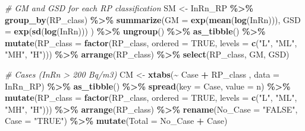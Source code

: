 \documentclass[
  12pt,
]{article}
\newenvironment{Shaded}{\begin{snugshade}}{\end{snugshade}}
\newcommand{\CommentTok}[1]{\textcolor[rgb]{0.56,0.35,0.01}{\textit{#1}}}
\newcommand{\DataTypeTok}[1]{\textcolor[rgb]{0.13,0.29,0.53}{#1}}
\newcommand{\KeywordTok}[1]{\textcolor[rgb]{0.13,0.29,0.53}{\textbf{#1}}}
\newcommand{\NormalTok}[1]{#1}
\newcommand{\OperatorTok}[1]{\textcolor[rgb]{0.81,0.36,0.00}{\textbf{#1}}}
\newcommand{\OtherTok}[1]{\textcolor[rgb]{0.56,0.35,0.01}{#1}}
\newcommand{\StringTok}[1]{\textcolor[rgb]{0.31,0.60,0.02}{#1}}
\begin{document}
\begin{Shaded}
\begin{Highlighting}[]
\CommentTok{\# GM and GSD for each RP classification}
\NormalTok{  SM \textless{}{-}}\StringTok{ }\NormalTok{InRn\_RP }\OperatorTok{\%\textgreater{}\%}
\StringTok{    }\KeywordTok{group\_by}\NormalTok{(RP\_class) }\OperatorTok{\%\textgreater{}\%}
\StringTok{    }\KeywordTok{summarize}\NormalTok{(}\DataTypeTok{GM  =} \KeywordTok{exp}\NormalTok{(}\KeywordTok{mean}\NormalTok{(}\KeywordTok{log}\NormalTok{(InRn))),}
              \DataTypeTok{GSD =} \KeywordTok{exp}\NormalTok{(}\KeywordTok{sd}\NormalTok{(}\KeywordTok{log}\NormalTok{(InRn))) }
\NormalTok{              ) }\OperatorTok{\%\textgreater{}\%}
\StringTok{    }\KeywordTok{ungroup}\NormalTok{() }\OperatorTok{\%\textgreater{}\%}
\StringTok{    }\KeywordTok{as\_tibble}\NormalTok{() }\OperatorTok{\%\textgreater{}\%}
\StringTok{    }\KeywordTok{mutate}\NormalTok{(}\DataTypeTok{RP\_class =} \KeywordTok{factor}\NormalTok{(RP\_class, }\DataTypeTok{ordered =} \OtherTok{TRUE}\NormalTok{, }
                             \DataTypeTok{levels =} \KeywordTok{c}\NormalTok{(}\StringTok{"L"}\NormalTok{, }\StringTok{"ML"}\NormalTok{, }\StringTok{"MH"}\NormalTok{, }\StringTok{"H"}\NormalTok{))) }\OperatorTok{\%\textgreater{}\%}
\StringTok{    }\KeywordTok{arrange}\NormalTok{(RP\_class) }\OperatorTok{\%\textgreater{}\%}
\StringTok{    }\KeywordTok{select}\NormalTok{(RP\_class, GM, GSD)}
  
\CommentTok{\# Cases (InRn \textgreater{} 200 Bq/m3)}
\NormalTok{  CM \textless{}{-}}\StringTok{ }\KeywordTok{xtabs}\NormalTok{(}\OperatorTok{\textasciitilde{}}\StringTok{ }\NormalTok{Case }\OperatorTok{+}\StringTok{ }\NormalTok{RP\_class , }\DataTypeTok{data =}\NormalTok{ InRn\_RP) }\OperatorTok{\%\textgreater{}\%}
\StringTok{    }\KeywordTok{as\_tibble}\NormalTok{() }\OperatorTok{\%\textgreater{}\%}
\StringTok{    }\KeywordTok{spread}\NormalTok{(}\DataTypeTok{key =}\NormalTok{ Case, }\DataTypeTok{value =}\NormalTok{ n) }\OperatorTok{\%\textgreater{}\%}
\StringTok{    }\KeywordTok{mutate}\NormalTok{(}\DataTypeTok{RP\_class =} \KeywordTok{factor}\NormalTok{(RP\_class, }\DataTypeTok{ordered =} \OtherTok{TRUE}\NormalTok{, }
                             \DataTypeTok{levels =} \KeywordTok{c}\NormalTok{(}\StringTok{"L"}\NormalTok{, }\StringTok{"ML"}\NormalTok{, }\StringTok{"MH"}\NormalTok{, }\StringTok{"H"}\NormalTok{))) }\OperatorTok{\%\textgreater{}\%}
\StringTok{    }\KeywordTok{arrange}\NormalTok{(RP\_class) }\OperatorTok{\%\textgreater{}\%}
\StringTok{    }\KeywordTok{rename}\NormalTok{(}\DataTypeTok{No\_Case =} \StringTok{"FALSE"}\NormalTok{, }
           \DataTypeTok{Case =}  \StringTok{"TRUE"}\NormalTok{) }\OperatorTok{\%\textgreater{}\%}
\StringTok{    }\KeywordTok{mutate}\NormalTok{(}\DataTypeTok{Total =}\NormalTok{ No\_Case }\OperatorTok{+}\StringTok{ }\NormalTok{Case)}


\end{Highlighting}
\end{Shaded}
\end{document}
